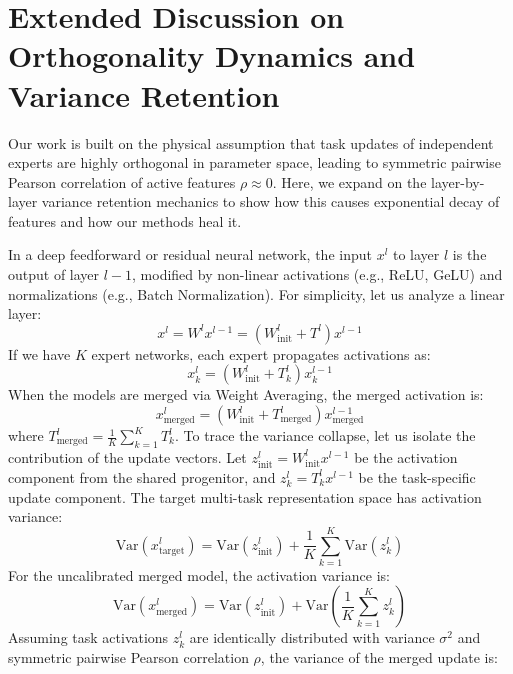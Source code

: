 \documentclass{article}
\begin{document}
\section{Extended Discussion on Orthogonality Dynamics and Variance Retention}
\label{app:orthogonality}

Our work is built on the physical assumption that task updates of independent experts are highly orthogonal in parameter space, leading to symmetric pairwise Pearson correlation of active features $\rho \approx 0$. Here, we expand on the layer-by-layer variance retention mechanics to show how this causes exponential decay of features and how our methods heal it.

In a deep feedforward or residual neural network, the input $x^l$ to layer $l$ is the output of layer $l-1$, modified by non-linear activations (e.g., ReLU, GeLU) and normalizations (e.g., Batch Normalization). For simplicity, let us analyze a linear layer:
\begin{equation}
    x^l = W^l x^{l-1} = (W_{\text{init}}^l + T^l) x^{l-1}
\end{equation}
If we have $K$ expert networks, each expert propagates activations as:
\begin{equation}
    x_k^l = (W_{\text{init}}^l + T_k^l) x_k^{l-1}
\end{equation}
When the models are merged via Weight Averaging, the merged activation is:
\begin{equation}
    x_{\text{merged}}^l = (W_{\text{init}}^l + T_{\text{merged}}^l) x_{\text{merged}}^{l-1}
\end{equation}
where $T_{\text{merged}}^l = \frac{1}{K} \sum_{k=1}^K T_k^l$.
To trace the variance collapse, let us isolate the contribution of the update vectors. Let $z_{\text{init}}^l = W_{\text{init}}^l x^{l-1}$ be the activation component from the shared progenitor, and $z_k^l = T_k^l x^{l-1}$ be the task-specific update component. The target multi-task representation space has activation variance:
\begin{equation}
    \text{Var}(x_{\text{target}}^l) = \text{Var}(z_{\text{init}}^l) + \frac{1}{K} \sum_{k=1}^K \text{Var}(z_k^l)
\end{equation}
For the uncalibrated merged model, the activation variance is:
\begin{equation}
    \text{Var}(x_{\text{merged}}^l) = \text{Var}(z_{\text{init}}^l) + \text{Var}\left( \frac{1}{K} \sum_{k=1}^K z_k^l \right)
\end{equation}
Assuming task activations $z_k^l$ are identically distributed with variance $\sigma^2$ and symmetric pairwise Pearson correlation $\rho$, the variance of the merged update is:
\end{document}
